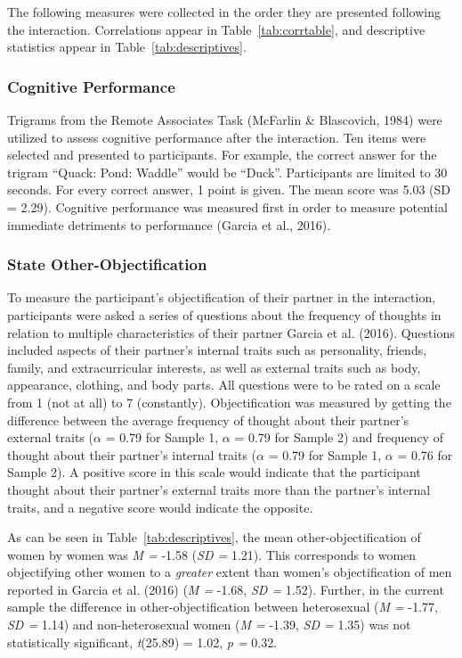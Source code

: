 \documentclass[man]{apa6}
\begin{document}
The following measures were collected in the order they are presented
following the interaction. Correlations appear in
Table~\ref{tab:corrtable}, and descriptive statistics appear in
Table~\ref{tab:descriptives}.

\subsubsection{Cognitive Performance}\label{cognitive-performance}

Trigrams from the Remote Associates Task (McFarlin \& Blascovich, 1984)
were utilized to assess cognitive performance after the interaction. Ten
items were selected and presented to participants. For example, the
correct answer for the trigram \enquote{Quack: Pond: Waddle} would be
\enquote{Duck}. Participants are limited to 30 seconds. For every
correct answer, 1 point is given. The mean score was 5.03 (SD = 2.29).
Cognitive performance was measured first in order to measure potential
immediate detriments to performance (Garcia et al., 2016).

\subsubsection{State
Other-Objectification}\label{state-other-objectification}

To measure the participant's objectification of their partner in the
interaction, participants were asked a series of questions about the
frequency of thoughts in relation to multiple characteristics of their
partner Garcia et al. (2016). Questions included aspects of their
partner's internal traits such as personality, friends, family, and
extracurricular interests, as well as external traits such as body,
appearance, clothing, and body parts. All questions were to be rated on
a scale from 1 (not at all) to 7 (constantly). Objectification was
measured by getting the difference between the average frequency of
thought about their partner's external traits (\(\alpha\) = 0.79 for
Sample 1, \(\alpha\) = 0.79 for Sample 2) and frequency of thought about
their partner's internal traits (\(\alpha\) = 0.79 for Sample 1,
\(\alpha\) = 0.76 for Sample 2). A positive score in this scale would
indicate that the participant thought about their partner's external
traits more than the partner's internal traits, and a negative score
would indicate the opposite.

As can be seen in Table~\ref{tab:descriptives}, the mean
other-objectification of women by women was \emph{M =} -1.58 (\emph{SD
=} 1.21). This corresponds to women objectifying other women to a
\emph{greater} extent than women's objectification of men reported in
Garcia et al. (2016) (\emph{M =} -1.68, \emph{SD =} 1.52). Further, in
the current sample the difference in other-objectification between
heterosexual (\emph{M =} -1.77, \emph{SD =} 1.14) and non-heterosexual
women (\emph{M =} -1.39, \emph{SD =} 1.35) was not statistically
significant, \emph{t}(25.89) = 1.02, \emph{p =} 0.32.
\end{document}
